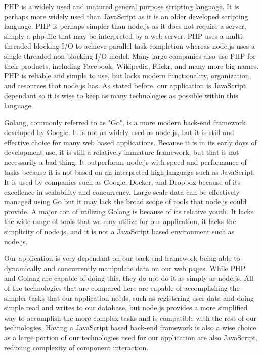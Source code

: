 	
		PHP is a widely used and matured general purpose scripting language. It is perhaps more widely used than JavaScript as it is an older developed scripting language. PHP is perhaps
		simpler than node.js as it does not require a server, simply a php file that may be interpreted by a web server. PHP uses a multi-threaded blocking I/O to achieve parallel task 
		completion whereas node.js uses a single threaded non-blocking I/O model. Many large companies also use PHP for their products, including Facebook, Wikipedia, Flickr, and many
		more big names. PHP is reliable and simple to use, but lacks modern functionality, organization, and resources that node.js has. As stated before, our application is JavaScript
		dependant so it is wise to keep as many technologies as possible within this language.
	
	
		Golang, commonly referred to as "Go", is a more modern back-end framework developed by Google. It is not as widely used as node.js, but it is still and effective choice 
		for many web based applications. Because it is in its early days of development use, it is still a relatively immature framework, but that is not necessarily a bad thing.
		It outperforms node.js with speed and performance of tasks because it is not based on an interpreted high language such as JavaScript. It is used by companies such as Google, 
		Docker, and Dropbox because of its excellence in scalability and concurrency. Large scale data can be effectively managed using Go but it may lack the broad scope of 
		tools that node.js could provide. A major con of utilizing Golang is because of its relative youth. It lacks the wide range of tools that we may
		utilize for our application, it lacks the simplicity of node.js, and it is not a JavaScript based environment such as node.js. 
	

	
		Our application is very dependant on our back-end framework being able to dynamically and concurrently manipulate data on our web pages. 
		While PHP and Golang are capable of doing this, they do not do it as simply as node.js. All of the technologies that are compared here are
		capable of accomplishing the simpler tasks that our application needs, such as registering user data and doing simple read and writes to our database,
		but node.js provides a more simplified way to accomplish the more complex tasks and is compatible with the rest of our technologies. Having a JavaScript
		based back-end framework is also a wise choice as a large portion of our technologies used for our application are also JavaScript, reducing complexity of component interaction. 
	
